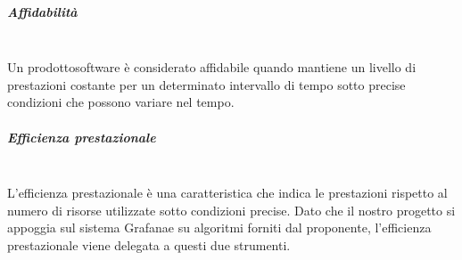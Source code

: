 		\subparagraph{Affidabilità} \mbox{}\\[1mm]
		Un prodotto\glosp software è considerato affidabile quando mantiene un livello di prestazioni costante per un determinato intervallo di tempo sotto precise condizioni che possono variare nel tempo.\\
	
		\subparagraph{Efficienza prestazionale} \mbox{}\\
		L'efficienza prestazionale è una caratteristica che indica le prestazioni rispetto al numero di risorse utilizzate sotto condizioni precise. Dato che il nostro progetto si appoggia sul sistema Grafana\glosp e su algoritmi forniti dal proponente, l'efficienza prestazionale viene delegata a questi due strumenti.
			

